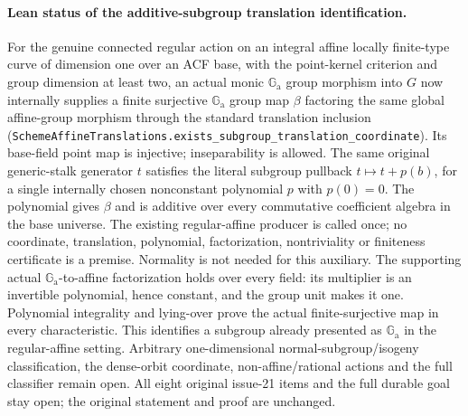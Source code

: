 \documentclass[11pt,oneside]{article}
\theoremstyle{definition}
\theoremstyle{remark}
\newcommand{\Ga}{\mathbb G_{\mathrm a}}
\newcommand{\lean}[1]{\nolinkurl{#1}}
\begin{document}
\paragraph{Lean status of the additive-subgroup translation identification.}
For the genuine connected regular action on an integral affine locally finite-type curve
of dimension one over an ACF base, with the point-kernel criterion and group dimension at
least two, an actual monic $\Ga$ group morphism into $G$ now internally supplies a finite
surjective $\Ga$ group map $\beta$ factoring the same global affine-group morphism through
the standard translation inclusion
(\lean{SchemeAffineTranslations.exists_subgroup_translation_coordinate}). Its base-field
point map is injective; inseparability is allowed. The same original generic-stalk generator
$t$ satisfies the literal subgroup pullback $t\mapsto t+p(b)$, for a single internally
chosen nonconstant polynomial $p$ with $p(0)=0$. The polynomial gives $\beta$ and is additive
over every commutative coefficient algebra in the base universe. The existing regular-affine
producer is called once; no coordinate, translation, polynomial, factorization, nontriviality
or finiteness certificate is a premise. Normality is not needed for this auxiliary. The
supporting actual $\Ga$-to-affine factorization holds over every field: its multiplier is
an invertible polynomial, hence constant, and the group unit makes it one. Polynomial
integrality and lying-over prove the actual finite-surjective map in every characteristic.
This identifies a subgroup already presented as $\Ga$ in the regular-affine setting.
Arbitrary one-dimensional normal-subgroup/isogeny classification, the dense-orbit coordinate,
non-affine/rational actions and the full classifier remain open. All eight original issue-21
items and the full durable goal stay open; the original statement and proof are unchanged.
\end{document}
